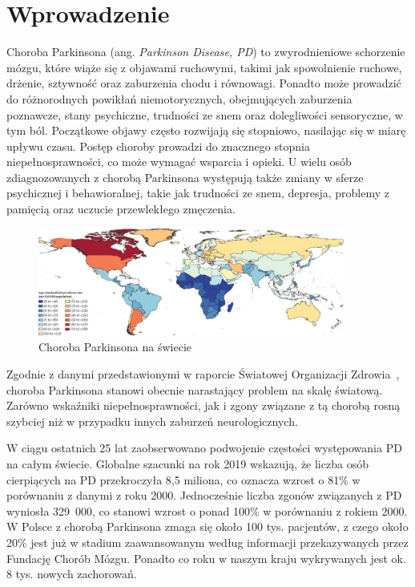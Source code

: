 \chapter{Wprowadzenie} \label{ch:wprowadzenie}

Choroba Parkinsona (ang. \emph {Parkinson Disease, PD}) to zwyrodnieniowe schorzenie mózgu, które wiąże się z objawami ruchowymi, takimi jak spowolnienie ruchowe,
drżenie, sztywność oraz zaburzenia chodu i równowagi.
Ponadto może prowadzić do różnorodnych powikłań niemotorycznych, obejmujących zaburzenia poznawcze, stany psychiczne,
trudności ze snem oraz dolegliwości sensoryczne, w tym ból.
Początkowe objawy często rozwijają się stopniowo, nasilając się w miarę upływu czasu.
Postęp choroby prowadzi do znacznego stopnia niepełnosprawności, co może wymagać wsparcia i opieki.
U wielu osób zdiagnozowanych z chorobą Parkinsona występują także zmiany w sferze psychicznej i behawioralnej, takie jak
trudności ze snem, depresja, problemy z pamięcią oraz uczucie przewlekłego zmęczenia.

\begin{figure}[htbp]
	\centering
	\includegraphics[width=0.9\textwidth]{./img/map}
	\caption{Choroba Parkinsona na świecie~\cite {global_PD}}
    \label{fig:PD_map}
\end{figure}

Zgodnie z danymi przedstawionymi w raporcie Światowej Organizacji Zdrowia~\cite{WHO}, choroba Parkinsona stanowi obecnie narastający problem na skalę światową.
Zarówno wskaźniki niepełnosprawności, jak i zgony związane z tą chorobą rosną szybciej niż w przypadku innych zaburzeń neurologicznych.

W ciągu ostatnich 25 lat zaobserwowano podwojenie częstości występowania PD na całym świecie.
Globalne szacunki na rok 2019 wskazują, że liczba osób cierpiących na PD przekroczyła 8,5 miliona, co oznacza wzrost o 81\% w porównaniu z danymi z roku 2000.
Jednocześnie liczba zgonów związanych z PD wyniosła 329~000, co stanowi wzrost o ponad 100\% w porównaniu z rokiem 2000\cite{global_PD}.
W Polsce z chorobą Parkinsona zmaga się około 100 tys.
pacjentów, z czego około 20\% jest już w stadium zaawansowanym
według informacji przekazywanych przez Fundację Chorób Mózgu.
Ponadto co roku w naszym kraju wykrywanych jest ok.
8 tys.
nowych zachorowań.

